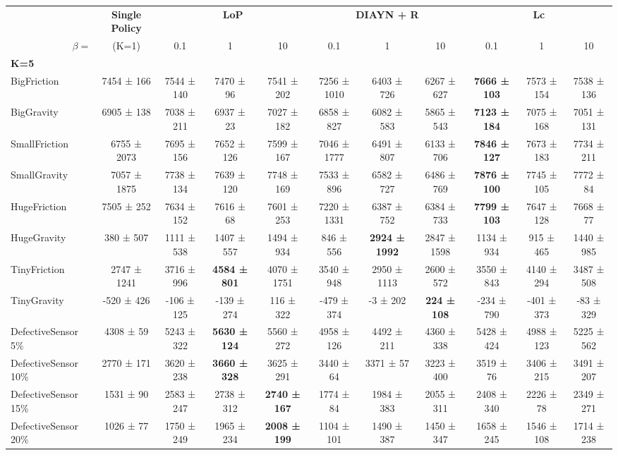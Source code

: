 \scriptsize{}
\begin{tabular}{l|c|ccc|ccc|ccc}
 &\multicolumn{1}{c}{\textbf{Single Policy}} &\multicolumn{3}{c}{\textbf{LoP}} & \multicolumn{3}{c}{\textbf{DIAYN + R}} &\multicolumn{3}{c}{\textbf{Lc}} \\ 
\multicolumn{1}{r|}{$\beta=$} & (K=1) & 0.1 & 1 & 10 & 0.1 & 1 & 10 & 0.1 & 1 & 10 \\
\midrule
\textbf{K=5} & & & & & & & & & & \\
BigFriction &7454 ± 166 &7544 ± 140 &7470 ± 96 &7541 ± 202 &7256 ± 1010 &6403 ± 726 &6267 ± 627 &\textbf{7666 ± 103} &7573 ± 154 &7538 ± 136 \\
BigGravity &6905 ± 138 &7038 ± 211 &6937 ± 23 &7027 ± 182 &6858 ± 827 &6082 ± 583 &5865 ± 543 &\textbf{7123 ± 184} &7075 ± 168 &7051 ± 131 \\
SmallFriction &6755 ± 2073 &7695 ± 156 &7652 ± 126 &7599 ± 167 &7046 ± 1777 &6491 ± 807 &6133 ± 706 &\textbf{7846 ± 127} &7673 ± 183 &7734 ± 211 \\
SmallGravity &7057 ± 1875 &7738 ± 134 &7639 ± 120 &7748 ± 169 &7533 ± 896 &6582 ± 727 &6486 ± 769 &\textbf{7876 ± 100} &7745 ± 105 &7772 ± 84 \\
HugeFriction &7505 ± 252 &7634 ± 152 &7616 ± 68 &7601 ± 253 &7220 ± 1331 &6387 ± 752 &6384 ± 733 &\textbf{7799 ± 103} &7647 ± 128 &7668 ± 77 \\
HugeGravity &380 ± 507 &1111 ± 538 &1407 ± 557 &1494 ± 934 &846 ± 556 &\textbf{2924 ± 1992} &2847 ± 1598 &1134 ± 934 &915 ± 465 &1440 ± 985 \\
TinyFriction &2747 ± 1241 &3716 ± 996 &\textbf{4584 ± 801} &4070 ± 1751 &3540 ± 948 &2950 ± 1113 &2600 ± 572 &3550 ± 843 &4140 ± 294 &3487 ± 508 \\
TinyGravity &-520 ± 426 &-106 ± 125 &-139 ± 274 &116 ± 322 &-479 ± 374 &-3 ± 202 &\textbf{224 ± 108} &-234 ± 790 &-401 ± 373 &-83 ± 329 \\
DefectiveSensor 5\% &4308 ± 59 &5243 ± 322 &\textbf{5630 ± 124} &5560 ± 272 &4958 ± 126 &4492 ± 211 &4360 ± 338 &5428 ± 424 &4988 ± 123 &5225 ± 562 \\
DefectiveSensor 10\% &2770 ± 171 &3620 ± 238 &\textbf{3660 ± 328} &3625 ± 291 &3440 ± 64 &3371 ± 57 &3223 ± 400 &3519 ± 76 &3406 ± 215 &3491 ± 207 \\
DefectiveSensor 15\% &1531 ± 90 &2583 ± 247 &2738 ± 312 &\textbf{2740 ± 167} &1774 ± 84 &1984 ± 383 &2055 ± 311 &2408 ± 340 &2226 ± 78 &2349 ± 271 \\
DefectiveSensor 20\% &1026 ± 77 &1750 ± 249 &1965 ± 234 &\textbf{2008 ± 199} &1104 ± 101 &1490 ± 387 &1450 ± 347 &1658 ± 245 &1546 ± 108 &1714 ± 238 \\

\end{tabular}

